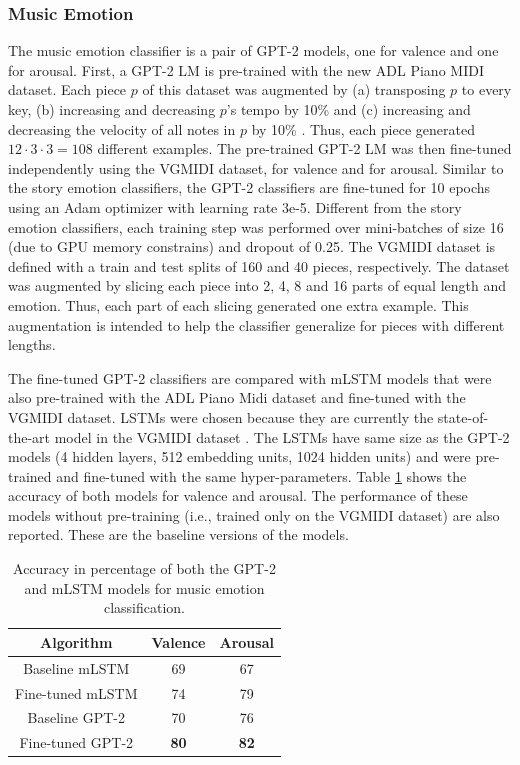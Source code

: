 \subsubsection{Music Emotion}

The music emotion classifier is a pair of GPT-2 models, one for valence and one for arousal. First, a GPT-2 LM is pre-trained with the new ADL Piano MIDI dataset. Each piece $p$ of this dataset was augmented by (a) transposing $p$ to every key, (b) increasing and decreasing $p$'s tempo by 10\% and (c) increasing and decreasing the velocity of all notes in $p$ by 10\% \cite{oore2017learning}. Thus, each piece generated $12 \cdot 3 \cdot 3 = 108$ different examples. The pre-trained GPT-2 LM was then fine-tuned independently using the VGMIDI dataset, for valence and for arousal. Similar to the story emotion classifiers, the GPT-2 classifiers are fine-tuned for 10 epochs using an Adam optimizer with learning rate 3e-5. Different from the story emotion classifiers, each training step was performed over mini-batches of size 16 (due to GPU memory constrains) and dropout of 0.25. The VGMIDI dataset is defined with a train and test splits of 160 and 40 pieces, respectively. The dataset was augmented by slicing each piece into 2, 4, 8 and 16 parts of equal length and emotion. Thus, each part of each slicing generated one extra example. This augmentation is intended to help the classifier generalize for pieces with different lengths.

The fine-tuned GPT-2 classifiers are compared with mLSTM models that were also pre-trained with the ADL Piano Midi dataset and fine-tuned with the VGMIDI dataset. LSTMs were chosen because they are currently the state-of-the-art model in the VGMIDI dataset \cite{ferreira_2019}. The LSTMs have same size as the GPT-2 models (4 hidden layers, 512 embedding units, 1024 hidden units) and were pre-trained and fine-tuned with the same hyper-parameters. Table \ref{tab:sent_accuracy} shows the accuracy of both models for valence and arousal. The performance of these models without pre-training (i.e., trained only on the VGMIDI dataset) are also reported. These are the baseline versions of the models.

\begin{table}[h!]
    \centering
    \begin{tabular}{ccc}
    \toprule
    \textbf{Algorithm} & \textbf{Valence} & \textbf{Arousal} \\
    \midrule
    Baseline mLSTM & 69 & 67 \\
    Fine-tuned mLSTM & 74 & 79 \\
    Baseline GPT-2 & 70 & 76 \\
    Fine-tuned GPT-2 & \textbf{80} & \textbf{82} \\
    \bottomrule
    \end{tabular}
    \caption{Accuracy in percentage of both the GPT-2 and mLSTM models for music emotion classification. }
    \label{tab:sent_accuracy}
\end{table}


